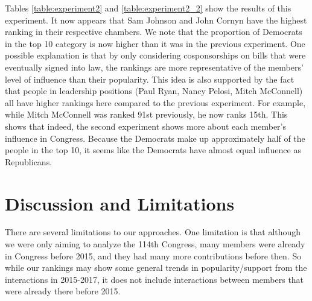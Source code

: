 \documentclass[11pt]{article}
\begin{document}
Tables \ref{table:experiment2} and \ref{table:experiment2_2} show the results of this experiment. It now appears that Sam Johnson and John Cornyn have the highest ranking in their respective chambers. We note that the proportion of Democrats in the top 10 category is now higher than it was in the previous experiment. One possible explanation is that by only considering cosponsorships on bills that were eventually signed into law, the rankings are more representative of the members' level of influence than their popularity.  This idea is also supported by the fact that people in leadership positions (Paul Ryan, Nancy Pelosi, Mitch McConnell) all have higher rankings here compared to the previous experiment. For example, while Mitch McConnell was ranked 91st previously, he now ranks 15th. This shows that indeed, the second experiment shows more about each member's influence in Congress. 
Because the Democrats make up approximately half of the people in the top 10, it seems like the Democrats have almost equal influence as Republicans. 
 
 












\section*{Discussion and Limitations}
There are several limitations to our approaches. One limitation is that although we were only aiming to analyze the 114th Congress, many members were already in Congress before 2015, and they had many more contributions before then. So while our rankings may show some general trends in popularity/support from the interactions in 2015-2017, it does not include interactions between members that were already there before 2015.
\end{document}

